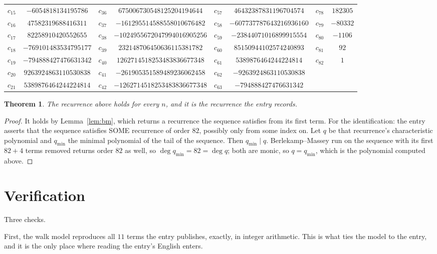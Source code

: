 \documentclass[11pt,a4paper]{article}
\theoremstyle{plain}
\newtheorem{theorem}{Theorem}
\theoremstyle{definition}
\begin{document}
\begin{center}
\begin{tabular}{cccccccc}
$c_{15}$ & $-6054818134195786$ & $c_{36}$ & $675006730548125204194644$ & $c_{57}$ & $46432387831196704574$ & $c_{78}$ & $182305$ \\
$c_{16}$ & $47582319688416311$ & $c_{37}$ & $-161295514588558010676482$ & $c_{58}$ & $-607737787643216936160$ & $c_{79}$ & $-80332$ \\
$c_{17}$ & $82258910420552655$ & $c_{38}$ & $-1024955672047994016905256$ & $c_{59}$ & $-23844071016899915554$ & $c_{80}$ & $-1106$ \\
$c_{18}$ & $-769101483534795177$ & $c_{39}$ & $232148706450636115381782$ & $c_{60}$ & $85150944102574240893$ & $c_{81}$ & $92$ \\
$c_{19}$ & $-794888427476631342$ & $c_{40}$ & $1262714518253483836677348$ & $c_{61}$ & $5389876464244224814$ & $c_{82}$ & $1$ \\
$c_{20}$ & $9263924863110530838$ & $c_{41}$ & $-261905351589489236062458$ & $c_{62}$ & $-9263924863110530838$ &  &  \\
$c_{21}$ & $5389876464244224814$ & $c_{42}$ & $-1262714518253483836677348$ & $c_{63}$ & $-794888427476631342$ &  &  \\
\end{tabular}
\end{center}

\begin{theorem}
The recurrence above holds for every $n$, and it is the recurrence the entry records.
\end{theorem}

\begin{proof}
It holds by Lemma~\ref{lem:bm}, which returns a recurrence the sequence satisfies from its
first term. For the identification: the entry asserts that the sequence satisfies SOME
recurrence of order $82$, possibly only from some index on. Let $q$ be that recurrence's
characteristic polynomial and $q_{\min}$ the minimal polynomial of the tail of the sequence.
Then $q_{\min}\mid q$. Berlekamp--Massey run on the sequence with its first $82+4$ terms
removed returns order $82$ as well, so $\deg q_{\min}=82=\deg q$; both are monic, so
$q=q_{\min}$, which is the polynomial computed above.
\end{proof}

\section{Verification}

Three checks.

First, the walk model reproduces all $11$ terms the entry publishes, exactly, in integer
arithmetic. This is what ties the model to the entry, and it is the only place where reading
the entry's English enters.
\end{document}
